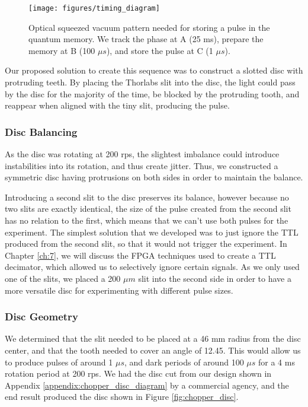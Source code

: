 \begin{figure}[!ht] 
 \centering 
 \texttt{[image: figures/timing\_diagram]} 
 \caption[Optical timing sequence for pulse generation]{Optical squeezed vacuum pattern needed for storing a pulse in the quantum memory.  We track the phase at A (25 ms), prepare the memory at B (100 $\mu s$), and store the pulse at C (1 $\mu s$).} 
 \label{fig:timing_diagram} 
\end{figure}

Our proposed solution to create this sequence was to construct a slotted disc with protruding teeth.  By placing the Thorlabs slit into the disc, the light could pass by the disc for the majority of the time, be blocked by the protruding tooth, and reappear when aligned with the tiny slit, producing the pulse.  


\subsubsection{Disc Balancing}
\label{disc_balancing} 

As the disc was rotating at 200 rps, the slightest imbalance could introduce instabilities into its rotation, and thus create jitter.  Thus, we constructed a symmetric disc having protrusions on both sides in order to maintain the balance.  

Introducing a second slit to the disc preserves its balance, however because no two slits are exactly identical, the size of the pulse created from the second slit has no relation to the first, which means that we can't use both pulses for the experiment.  The simplest solution that we developed was to just ignore the TTL produced from the second slit, so that it would not trigger the experiment.  In Chapter \ref{ch:7}, we will discuss the FPGA techniques used to create a TTL decimator, which allowed us to selectively ignore certain signals.  As we only used one of the slits, we placed a 200 $\mu m$ slit into the second side in order to have a more versatile disc for experimenting with different pulse sizes.


\subsubsection{Disc Geometry}
\label{disc_geometry} 

We determined that the slit needed to be placed at a 46 mm radius from the disc center, and that the tooth needed to cover an angle of 12.45\textdegree .  This would allow us to produce pulses of around 1 $\mu s$, and dark periods of around 100 $\mu s$ for a 4 ms rotation period at 200 rps.  We had the disc cut from our design shown in Appendix \ref{appendix:chopper_disc_diagram} by a commercial agency, and the end result produced the disc shown in Figure \ref{fig:chopper_disc}.

